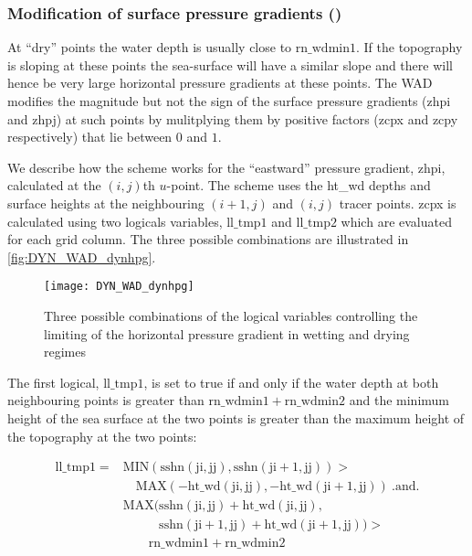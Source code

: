 \documentclass[../main/NEMO_manual]{subfiles}
\begin{document}
\subsubsection[Modification of surface pressure gradients (\textit{dynhpg.F90})]{Modification of surface pressure gradients ()}
\label{subsec:DYN_wd_il_spg}

At ``dry'' points the water depth is usually close to $\mathrm{rn\_wdmin1}$. If the
topography is sloping at these points the sea-surface will have a similar slope and there
will hence be very large horizontal pressure gradients at these points. The WAD modifies
the magnitude but not the sign of the surface pressure gradients (zhpi and zhpj) at such
points by mulitplying them by positive factors (zcpx and zcpy respectively) that lie
between $0$ and $1$.

We describe how the scheme works for the ``eastward'' pressure gradient, zhpi, calculated
at the $(i,j)$th $u$-point. The scheme uses the ht\_wd depths and surface heights at the
neighbouring $(i+1,j)$ and $(i,j)$ tracer points.  zcpx is calculated using two logicals
variables, $\mathrm{ll\_tmp1}$ and $\mathrm{ll\_tmp2}$ which are evaluated for each grid
column.  The three possible combinations are illustrated in \autoref{fig:DYN_WAD_dynhpg}.

\begin{figure}[!ht]
  \centering
  \texttt{[image: DYN\_WAD\_dynhpg]}
  \caption[Combinations controlling the limiting of the horizontal pressure gradient in
  wetting and drying regimes]{
    Three possible combinations of the logical variables controlling the
    limiting of the horizontal pressure gradient in wetting and drying regimes}
  \label{fig:DYN_WAD_dynhpg}
\end{figure}

The first logical, $\mathrm{ll\_tmp1}$, is set to true if and only if the water depth at
both neighbouring points is greater than $\mathrm{rn\_wdmin1} + \mathrm{rn\_wdmin2}$ and
the minimum height of the sea surface at the two points is greater than the maximum height
of the topography at the two points:

\begin{equation}
  \label{eq:DYN_ll_tmp1}
  \begin{split}
    \mathrm{ll\_tmp1}  = & \mathrm{MIN(sshn(ji,jj), sshn(ji+1,jj))} > \\
                     & \quad \mathrm{MAX(-ht\_wd(ji,jj), -ht\_wd(ji+1,jj))\  .and.} \\
                     & \mathrm{MAX(sshn(ji,jj) + ht\_wd(ji,jj),} \\
                     & \mathrm{\phantom{MAX(}sshn(ji+1,jj) + ht\_wd(ji+1,jj))} >\\
                     & \quad\quad\mathrm{rn\_wdmin1 + rn\_wdmin2 }
  \end{split}
\end{equation}
\end{document}
